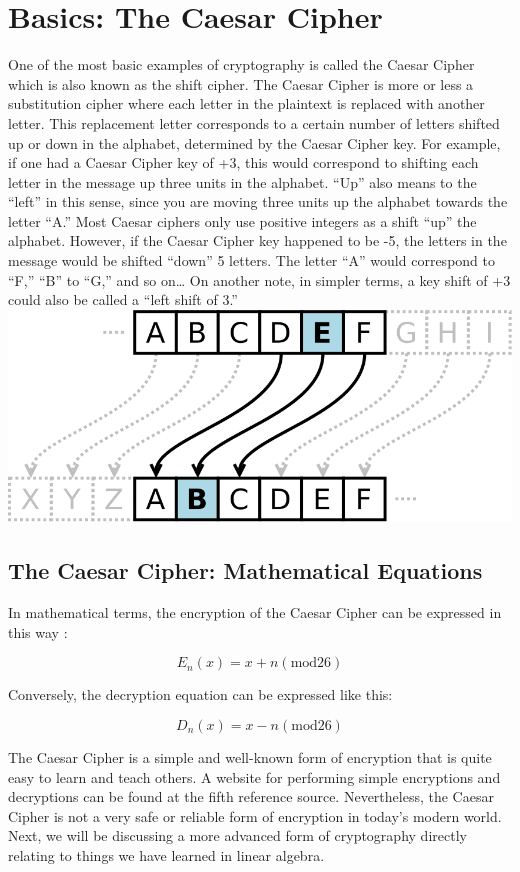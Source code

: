 \documentclass{article}
\begin{document}
\section{Basics: The Caesar Cipher}
One of the most basic examples of cryptography is called the Caesar Cipher which is also known as the shift cipher. The Caesar Cipher is more or less a substitution cipher where each letter in the plaintext is replaced with another letter. This replacement letter corresponds to a certain number of letters shifted up or down in the alphabet, determined by the Caesar Cipher key. For example, if one had a Caesar Cipher key of +3, this would correspond to shifting each letter in the message up three units in the alphabet. “Up” also means to the “left” in this sense, since you are moving three units up the alphabet towards the letter “A.” Most Caesar ciphers only use positive integers as a shift “up” the alphabet. However, if the Caesar Cipher key happened to be -5, the letters in the message would be shifted “down” 5 letters. The letter “A” would correspond to “F,” “B” to “G,” and so on… On another note, in simpler terms, a key shift of +3 could also be called a “left shift of 3.”\\

\includegraphics[scale=0.46]{caesar_cipher}

\subsection{The Caesar Cipher: Mathematical Equations}
In mathematical terms, the encryption of the Caesar Cipher can be expressed in this way \cite{ref3:3}:

$$ E_{n}(x) = x + n  (\text{mod}26)$$

Conversely, the decryption equation can be expressed like this:

$$ D_{n}(x) = x - n  (\text{mod}26)$$

\noindent
The Caesar Cipher is a simple and well-known form of encryption that is quite easy to learn and teach others. A website for performing simple encryptions and decryptions can be found at the fifth reference source. Nevertheless, the Caesar Cipher is not a very safe or reliable form of encryption in today’s modern world. Next, we will be discussing a more advanced form of cryptography directly relating to things we have learned in linear algebra.
\end{document}
